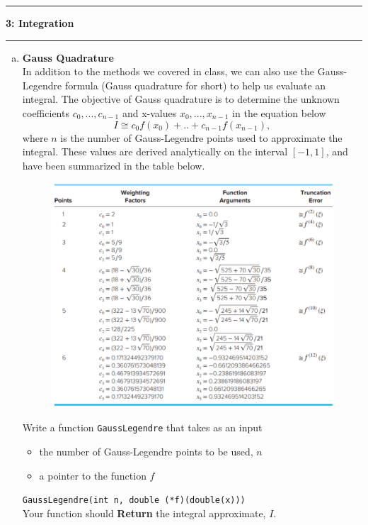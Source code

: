\documentclass[11pt]{article}
\newcommand\question[2]{\vspace{.25in}\hrule\textbf{#1: #2}\vspace{.5em}\hrule\vspace{.10in}}
\begin{document}
\newpage
\question{3}{Integration}
\begin{enumerate}[(a)]
	\item \textbf{Gauss Quadrature}\\
	In addition to the methods we covered in class, we can also use the Gauss-Legendre formula (Gauss quadrature for short) to help us evaluate an integral. The objective of Gauss quadrature is to determine the unknown coefficients $c_0,...,c_{n-1}$ and x-values $x_0,...,x_{n-1}$ in the equation below 
	$$I \cong c_0f(x_0)+..+c_{n-1}f(x_{n-1}),$$
	where $n$ is the number of Gauss-Legendre points used to approximate the integral. These values are derived analytically on the interval $[-1,1]$, and have been summarized in the table below.
	\begin{figure}[H]
		\centering
		\includegraphics[width=.8\textwidth]{Integration}
	\end{figure}
	Write a function \texttt{GaussLegendre} that takes as an input
	\begin{itemize}
		\item the number of Gauss-Legendre points to be used, $n$ 
		\item a pointer to the function $f$
	\end{itemize}
	\texttt{GaussLegendre(int n, double (*f)(double(x)))}\\
	Your function should \textbf{Return} the integral approximate, $I$.
	
\end{enumerate}
\newpage
\end{document}
